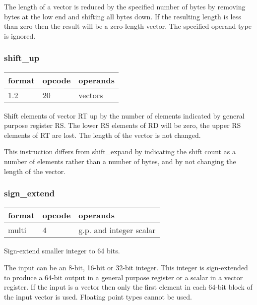 \documentclass[forwardcom.tex]{subfiles}
\begin{document}
The length of a vector is reduced by the specified number of bytes by removing bytes at the low end and shifting all bytes down. If the resulting length is less than zero then the result will be a zero-length vector. The specified operand type is ignored.

\subsubsection{shift\_up}
\label{table:shiftUpInstruction}
\begin{tabular}{|p{12mm}|p{12mm}|p{110mm}|}
\hline
\bfseries format & \bfseries opcode & \bfseries operands \\ \hline
1.2 & 20 & vectors \\ \hline
\end{tabular}
\vspace{2mm}

Shift elements of vector RT up by the number of elements indicated by general purpose register RS. 
The lower RS elements of RD will be zero, the upper RS elements of RT are lost. The length of the vector is not changed.
\vspace{2mm}

This instruction differs from shift\_expand by indicating the shift count as a number of elements rather than a number of bytes, and by not changing the length of the vector.

\subsubsection{sign\_extend}
\label{table:signExtendInstruction}
\begin{tabular}{|p{12mm}|p{12mm}|p{110mm}|}
\hline
\bfseries format & \bfseries opcode & \bfseries operands \\ \hline
multi & 4 & g.p. and integer scalar \\ \hline
\end{tabular}
\vspace{2mm}

Sign-extend smaller integer to 64 bits.

\vspace{2mm}
The input can be an 8-bit, 16-bit or 32-bit integer. This integer is sign-extended to produce a 64-bit output in a general purpose register or a scalar in a vector register. If the input is a vector then only the first element in each 64-bit block of the input vector is used. Floating point types cannot be used.
\end{document}
